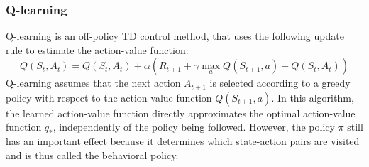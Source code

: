 \subsubsection{Q-learning}
Q-learning is an off-policy TD control method, that uses the following update rule to estimate the action-value function:
\begin{equation}
    Q(S_t, A_t) = Q(S_t, A_t) + \alpha (R_{t+1} + \gamma \max_a{Q(S_{t+1}, a)} - Q(S_t, A_t))
    \label{Q-learning-update}
\end{equation}
Q-learning assumes that the next action $A_{t+1}$ is selected according to a greedy policy with respect to the action-value function $Q(S_{t+1}, a)$. In this algorithm, the learned action-value function directly approximates the optimal action-value function $q_*$, independently of the policy being followed. However, the policy $\pi$ still has an important effect because it determines which state-action pairs are visited and is thus called the behavioral policy.

